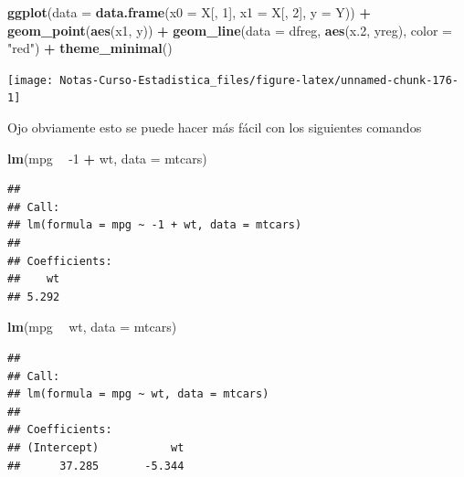 \documentclass[
  12pt,
]{book}
\newenvironment{Shaded}{\begin{snugshade}}{\end{snugshade}}
\newcommand{\DataTypeTok}[1]{\textcolor[rgb]{0.13,0.29,0.53}{#1}}
\newcommand{\DecValTok}[1]{\textcolor[rgb]{0.00,0.00,0.81}{#1}}
\newcommand{\FloatTok}[1]{\textcolor[rgb]{0.00,0.00,0.81}{#1}}
\newcommand{\KeywordTok}[1]{\textcolor[rgb]{0.13,0.29,0.53}{\textbf{#1}}}
\newcommand{\NormalTok}[1]{#1}
\newcommand{\OperatorTok}[1]{\textcolor[rgb]{0.81,0.36,0.00}{\textbf{#1}}}
\newcommand{\StringTok}[1]{\textcolor[rgb]{0.31,0.60,0.02}{#1}}
\theoremstyle{definition}
\theoremstyle{definition}
\theoremstyle{definition}
\theoremstyle{remark}
\begin{document}
\begin{Shaded}
\begin{Highlighting}[]
\KeywordTok{ggplot}\NormalTok{(}\DataTypeTok{data =} \KeywordTok{data.frame}\NormalTok{(}\DataTypeTok{x0 =}\NormalTok{ X[, }\DecValTok{1}\NormalTok{], }\DataTypeTok{x1 =}\NormalTok{ X[, }\DecValTok{2}\NormalTok{], }
    \DataTypeTok{y =}\NormalTok{ Y)) }\OperatorTok{+}\StringTok{ }\KeywordTok{geom_point}\NormalTok{(}\KeywordTok{aes}\NormalTok{(x1, y)) }\OperatorTok{+}\StringTok{ }\KeywordTok{geom_line}\NormalTok{(}\DataTypeTok{data =}\NormalTok{ dfreg, }
    \KeywordTok{aes}\NormalTok{(x}\FloatTok{.2}\NormalTok{, yreg), }\DataTypeTok{color =} \StringTok{"red"}\NormalTok{) }\OperatorTok{+}\StringTok{ }\KeywordTok{theme_minimal}\NormalTok{()}
\end{Highlighting}
\end{Shaded}

\begin{center}\texttt{[image: Notas-Curso-Estadistica\_files/figure-latex/unnamed-chunk-176-1]} \end{center}

Ojo obviamente esto se puede hacer más fácil con los siguientes comandos

\begin{Shaded}
\begin{Highlighting}[]
\KeywordTok{lm}\NormalTok{(mpg }\OperatorTok{~}\StringTok{ }\DecValTok{-1} \OperatorTok{+}\StringTok{ }\NormalTok{wt, }\DataTypeTok{data =}\NormalTok{ mtcars)}
\end{Highlighting}
\end{Shaded}

\begin{verbatim}
## 
## Call:
## lm(formula = mpg ~ -1 + wt, data = mtcars)
## 
## Coefficients:
##    wt  
## 5.292
\end{verbatim}

\begin{Shaded}
\begin{Highlighting}[]
\KeywordTok{lm}\NormalTok{(mpg }\OperatorTok{~}\StringTok{ }\NormalTok{wt, }\DataTypeTok{data =}\NormalTok{ mtcars)}
\end{Highlighting}
\end{Shaded}

\begin{verbatim}
## 
## Call:
## lm(formula = mpg ~ wt, data = mtcars)
## 
## Coefficients:
## (Intercept)           wt  
##      37.285       -5.344
\end{verbatim}
\end{document}
